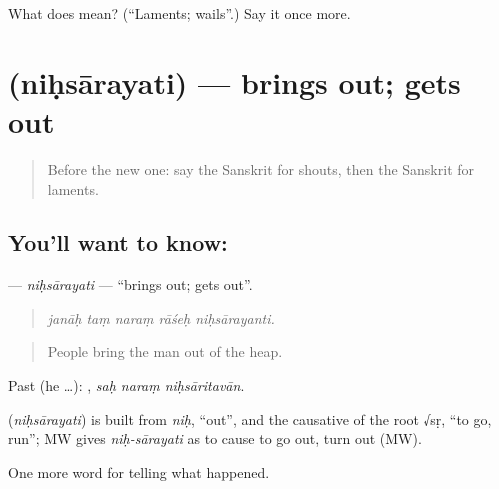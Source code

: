 \begin{tcolorbox}[breakable,colback=teal!4,colframe=teal!35!black,title={Before you move on}]
What does  mean? (\textquotedblleft{}Laments; wails\textquotedblright{}.) Say it once more.
\end{tcolorbox}
\section[\texorpdfstring{\sk{निःसारयति} (niḥsārayati)}{निःसारयति (niḥsārayati)}]{ (niḥsārayati) — brings out; gets out}

\label{lesson:SA-C304-nihsarayati}



\begin{quote}
Before the new one: say the Sanskrit for shouts, then the Sanskrit for laments.
\end{quote}

\subsection*{You'll want to know: }
\textbf{} — \emph{niḥsārayati} — \textquotedblleft{}brings out; gets out\textquotedblright{}.

\begin{quote}
    
\end{quote}

\begin{quote}
\emph{janāḥ taṃ naraṃ rāśeḥ niḥsārayanti.}
\end{quote}

\begin{quote}
People bring the man out of the heap.
\end{quote}

Past (he …):   , \emph{saḥ naraṃ niḥsāritavān}.

\begin{cousinweb}
\textbf{} (\emph{niḥsārayati}) is built from \emph{niḥ}, \textquotedblleft{}out\textquotedblright{}, and the causative of the root √sṛ, \textquotedblleft{}to go, run\textquotedblright{}; MW gives \emph{niḥ-sārayati} as to cause to go out, turn out (MW).
\end{cousinweb}

\begin{grammarlens}[title={What you've built}]
One more word for telling what happened.
\end{grammarlens}

